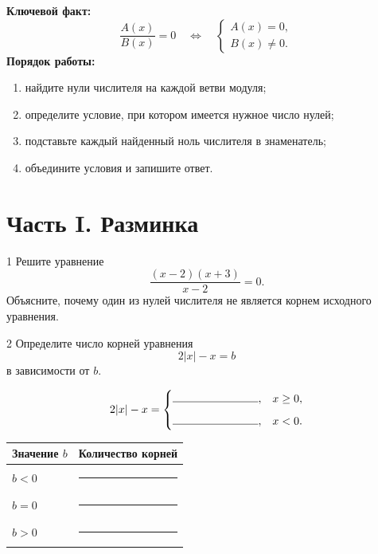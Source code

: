 \studentline

\begin{routebox}
  \textbf{Ключевой факт:}
  \[
    \frac{A(x)}{B(x)}=0
    \quad\Longleftrightarrow\quad
    \begin{cases}
      A(x)=0,\\
      B(x)\ne0.
    \end{cases}
  \]
  \textbf{Порядок работы:}
  \begin{enumerate}[label=\arabic*.,leftmargin=1.8em,itemsep=0.2em,topsep=0.25em]
    \item найдите нули числителя на каждой ветви модуля;
    \item определите условие, при котором имеется нужное число нулей;
    \item подставьте каждый найденный ноль числителя в знаменатель;
    \item объедините условия и запишите ответ.
  \end{enumerate}
\end{routebox}

\section*{Часть I. Разминка}

\begin{homeworktask}{1}
  Решите уравнение
  \[
    \frac{(x-2)(x+3)}{x-2}=0.
  \]
  Объясните, почему один из нулей числителя не является корнем исходного
  уравнения.
\end{homeworktask}
\answerspace{16mm}

\begin{homeworktask}{2}
  Определите число корней уравнения
  \[
    2|x|-x=b
  \]
  в зависимости от \(b\).

  \[
    2|x|-x=
    \begin{cases}
      \rule{27mm}{0.4pt}, & x\ge0,\\[2mm]
      \rule{27mm}{0.4pt}, & x<0.
    \end{cases}
  \]

  \begin{center}
    \renewcommand{\arraystretch}{1.4}
    \begin{tabularx}{0.78\textwidth}{>{\centering\arraybackslash}p{}>{\centering\arraybackslash}X}
      \toprule
      \rowcolor{TableHeader}
      Значение \(b\) & Количество корней \\
      \midrule
      \(b<0\) & \rule{30mm}{0.4pt} \\
      \(b=0\) & \rule{30mm}{0.4pt} \\
      \(b>0\) & \rule{30mm}{0.4pt} \\
      \bottomrule
    \end{tabularx}
  \end{center}
\end{homeworktask}

